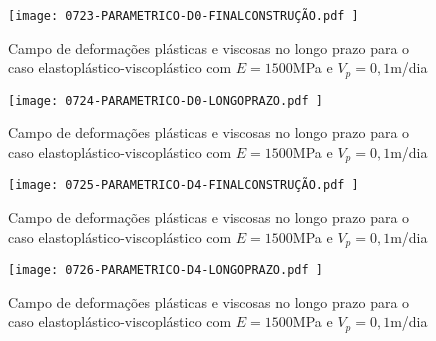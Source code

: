 \begin{figure}[H]
	\begin{center}
		\texttt{[image: 0723-PARAMETRICO-D0-FINALCONSTRUÇÃO.pdf
		]}
	\end{center}
	\caption{\label{PIEPI-E1500-CAMPO_DEFORMACOES}Campo de deformações plásticas e viscosas no longo prazo para o caso elastoplástico-viscoplástico com $E=1500$MPa e $V_p=0,1$m/dia}
\end{figure}

\begin{figure}[H]
	\begin{center}
		\texttt{[image: 0724-PARAMETRICO-D0-LONGOPRAZO.pdf
		]}
	\end{center}
	\caption{\label{PIEPI-E1500-CAMPO_DEFORMACOES}Campo de deformações plásticas e viscosas no longo prazo para o caso elastoplástico-viscoplástico com $E=1500$MPa e $V_p=0,1$m/dia}
\end{figure}

\begin{figure}[H]
	\begin{center}
		\texttt{[image: 0725-PARAMETRICO-D4-FINALCONSTRUÇÃO.pdf
		]}
	\end{center}
	\caption{\label{PIEPI-E1500-CAMPO_DEFORMACOES}Campo de deformações plásticas e viscosas no longo prazo para o caso elastoplástico-viscoplástico com $E=1500$MPa e $V_p=0,1$m/dia}
\end{figure}

\begin{figure}[H]
	\begin{center}
		\texttt{[image: 0726-PARAMETRICO-D4-LONGOPRAZO.pdf
		]}
	\end{center}
	\caption{\label{PIEPI-E1500-CAMPO_DEFORMACOES}Campo de deformações plásticas e viscosas no longo prazo para o caso elastoplástico-viscoplástico com $E=1500$MPa e $V_p=0,1$m/dia}
\end{figure}



